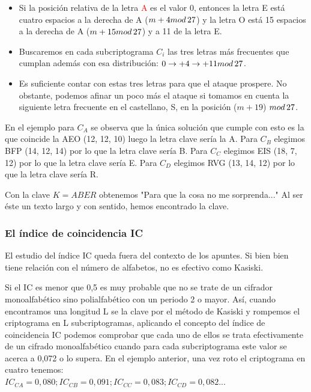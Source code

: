 \documentclass{article}
\begin{document}
\begin{itemize}
    \item Si la posición relativa de la letra \textcolor{red}{A} es el valor 0, entonces la letra E está cuatro espacios a la derecha de A ($m+4 mod \thinspace 27 $) y la letra O está 15 espacios a la derecha de A ($m+ 15 mod \thinspace 27 $) y a 11 de la letra E.
    \item Buscaremos en cada subcriptograma $C_{i}$ las tres letras más frecuentes que cumplan además con esa distribución: $0\rightarrow +4 \rightarrow +11 mod \thinspace 27$.
    \item Es suficiente contar con estas tres letras para que el ataque prospere. No obstante, podemos afinar un poco más el ataque si tomamos en cuenta la siguiente letra frecuente en el castellano, S, en la posición ($m+19$) $mod \thinspace 27$.
\end{itemize}
\justify
En el ejemplo para $C_{A}$ se observa que la única solución que cumple con esto es la que coincide la AEO (12, 12, 10) luego la letra clave sería la A. Para $C_{B}$ elegimos BFP (14, 12, 14) por lo que la letra clave sería B. Para $C_{C}$ elegimos EIS (18, 7, 12) por lo que la letra clave sería E. Para $C_{D}$ elegimos RVG (13, 14, 12) por lo que la letra clave sería R.

Con la clave $K=ABER$ obtenemos "Para que la cosa no me sorprenda..." Al ser éste un texto largo y con sentido, hemos encontrado la clave. 
\subsubsection{El índice de coincidencia IC}
\justify
El estudio del índice IC queda fuera del contexto de los apuntes. Si bien bien tiene relación con el número de alfabetos, no es efectivo como Kasiski.






Si el IC es menor que 0,5 es muy probable que no se trate de un cifrador monoalfabético sino polialfabético con un periodo 2 o mayor.
Así, cuando encontramos una longitud L se la clave por el método de Kasiski y rompemos el criptograma en L subcriptogramas, aplicando el concepto del índice de coincidencia IC podemos comprobar que cada uno de ellos se trata efectivamente de un cifrado monoalfabético cuando para cada subcriptograma este valor se acerca a 0,072 o lo supera.
En el ejemplo anterior, una vez roto el criptograma en cuatro tenemos: \\ 
$IC_{CA}=0,080; IC_{CB}=0,091; IC_{CC}=0,083; IC_{CD}=0,082...$
\end{document}
